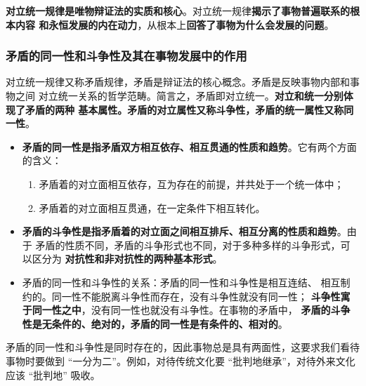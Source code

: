 \documentclass[utf-8, 10pt]{article}
\begin{document}
\textbf{对立统一规律是唯物辩证法的实质和核心}。对立统一规律\textbf{揭示了事物普遍联系的根本内容
和永恒发展的内在动力}，从根本上\textbf{回答了事物为什么会发展的问题}。

\subsubsection{矛盾的同一性和斗争性及其在事物发展中的作用}



对立统一规律又称矛盾规律，矛盾是辩证法的核心概念。矛盾是反映事物内部和事物之间
对立统一关系的哲学范畴。简言之，矛盾即对立统一。\textbf{对立和统一分别体现了矛盾的两种
基本属性。矛盾的对立属性又称斗争性，矛盾的统一属性又称同一性}。
\begin{itemize}[itemsep=0pt]
    \item \textbf{矛盾的同一性是指矛盾双方相互依存、相互贯通的性质和趋势}。它有两个方面
    的含义：
    \begin{enumerate}[label={${\arabic*}^\circ$}, itemsep=0pt]
        \item 矛盾着的对立面相互依存，互为存在的前提，并共处于一个统一体中；
        \item 矛盾着的对立面相互贯通，在一定条件下相互转化。
    \end{enumerate}
    \item \textbf{矛盾的斗争性是指矛盾着的对立面之间相互排斥、相互分离的性质和趋势}。由于
    矛盾的性质不同，矛盾的斗争形式也不同，对于多种多样的斗争形式，可以区分为
    \textbf{对抗性和非对抗性的两种基本形式}。
    \item 矛盾的同一性和斗争性的关系：矛盾的同一性和斗争性是相互连结、
    相互制约的。同一性不能脱离斗争性而存在，没有斗争性就没有同一性；
    \textbf{斗争性寓于同一性之中}，没有同一性也就没有斗争性。在事物的矛盾中，
    \textbf{矛盾的斗争性是无条件的、绝对的，矛盾的同一性是有条件的、相对的}。
\end{itemize}
矛盾的同一性和斗争性是同时存在的，因此事物总是具有两面性，这要求我们看待
事物时要做到 “一分为二”。例如，对待传统文化要 “批判地继承”，对待外来文化应该
“批判地” 吸收。
\end{document}
